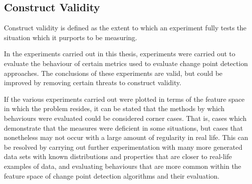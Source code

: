 \documentclass[../main.tex]{subfiles}
\begin{document}
\subsection{Construct Validity}

Construct validity is defined as the extent to which an experiment fully tests the situation which it purports to be measuring.

In the experiments carried out in this thesis, experiments were carried out to evaluate the behaviour of certain metrics used to evaluate change point detection approaches. The conclusions of these experiments are valid, but could be improved by removing certain threats to construct validity.

If the various experiments carried out were plotted in terms of the feature space in which the problem resides, it can be stated that the methods by which behaviours were evaluated could be considered corner cases. That is, cases which demonstrate that the measures were deficient in some situations, but cases that nonetheless may not occur with a large amount of regularity in real life. This can be resolved by carrying out further experimentation with many more generated data sets with known distributions and properties that are closer to real-life examples of data, and evaluating behaviours that are more common within the feature space of change point detection algorithms and their evaluation.
\end{document}
